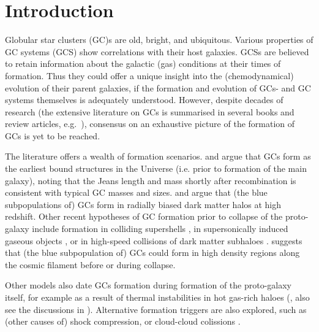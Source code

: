 \documentclass[a4paper,fleqn,usenatbib]{mnras}
\begin{document}


\section{Introduction}
Globular star clusters (GC)s are old, bright, and ubiquitous. Various properties of
GC systems (GCS) show correlations with their host galaxies. GCSs are believed to
retain information about the galactic (gas) conditions at their times of formation.
Thus they could offer a unique insight into the (chemodynamical) evolution of their 
parent galaxies, if the formation and evolution of GCs- and GC systems themselves 
is adequately understood. However, despite decades of research (the extensive 
literature on GCs is summarised in several books and review articles, e.g.~\citealt{
1991ARA&A..29..543H, Harris2001, 2004Natur.427...31W, 2006ARA&A..44..193B, 
2012A&ARv..20...50G, 2014CQGra..31x4006K, 2018RSPSA.47470616F}), consensus on an 
exhaustive picture of the formation of GCs is yet to be reached.

The literature offers a wealth of formation scenarios. \citet{1968ApJ...154..891P}
and \citet{1984ApJ...277..470P} argue that GCs form as the earliest bound
structures in the Universe (i.e. prior to formation of the main galaxy), 
noting that the Jeans length and mass shortly after recombination is consistent
with typical GC masses and sizes. \citet{2005MNRAS.364..367D} and \citet{
2009ApJ...706L.192B} argue that (the blue subpopulations of) GCs form in radially
biased dark matter halos at high redshift. Other recent hypotheses of GC formation 
prior to collapse of the proto-galaxy include formation in colliding supershells 
\citep{2017Ap&SS.362..183R}, in supersonically induced gaseous objects
\citep{2019arXiv190408941C}, or in high-speed collisions of dark matter subhaloes
\citep{2019arXiv190508951M}. \citet{2017MNRAS.472.3120B} suggests
that (the blue subpopulation of) GCs could form in high density regions along
the cosmic filament before or during collapse.

Other models also date GCs formation during formation of the proto-galaxy itself,
for example as a result of thermal instabilities in hot gas-rich haloes 
(\citealt{1985ApJ...298...18F}, also see the discussions in \citealt{
1990ApJ...363..488K}). Alternative formation triggers are also explored, such as 
(other causes of) shock compression, or cloud-cloud colissions \citep[e.g.][]{
1980glcl.conf..301G, 1992ApJ...400..265M, 1994ApJ...429..177H, 1995ApJ...442..618V,
1996ASPC...92..241L, 2001ApJ...560..592C}. 
\end{document}

